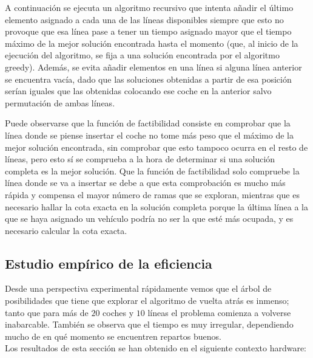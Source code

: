 

A continuación se ejecuta un algoritmo recursivo que intenta añadir el último elemento asignado a cada una de las líneas disponibles siempre que esto no provoque que esa línea pase a tener un tiempo asignado mayor que el tiempo máximo de la mejor solución encontrada hasta el momento (que, al inicio de la ejecución del algoritmo, se fija a una solución encontrada por el algoritmo greedy). Además, se evita añadir elementos en una línea si alguna línea anterior se encuentra vacía, dado que las soluciones obtenidas a partir de esa posición serían iguales que las obtenidas colocando ese coche en la anterior salvo permutación de ambas líneas.



Puede observarse que la función de factibilidad consiste en comprobar que la línea donde se piense insertar el coche no tome más peso que el máximo de la mejor solución encontrada, sin comprobar que esto tampoco ocurra en el resto de líneas, pero esto sí se comprueba a la hora de determinar si una solución completa es la mejor solución. Que la función de factibilidad solo compruebe la línea donde se va a insertar se debe a que esta comprobación es mucho más rápida y compensa el mayor número de ramas que se exploran, mientras que es necesario hallar la cota exacta en la solución completa porque la última línea a la que se haya asignado un vehículo podría no ser la que esté más ocupada, y es necesario calcular la cota exacta.

\subsection{Estudio empírico de la eficiencia}

Desde una perspectiva experimental rápidamente vemos que el árbol de posibilidades que tiene que explorar el algoritmo de vuelta atrás es inmenso; tanto que para más de $20$ coches y $10$ líneas el problema comienza a volverse inabarcable. También se observa que el tiempo es muy irregular, dependiendo mucho de en qué momento se encuentren repartos buenos. \\

Los resultados de esta sección se han obtenido en el siguiente contexto hardware: \\
 \\

